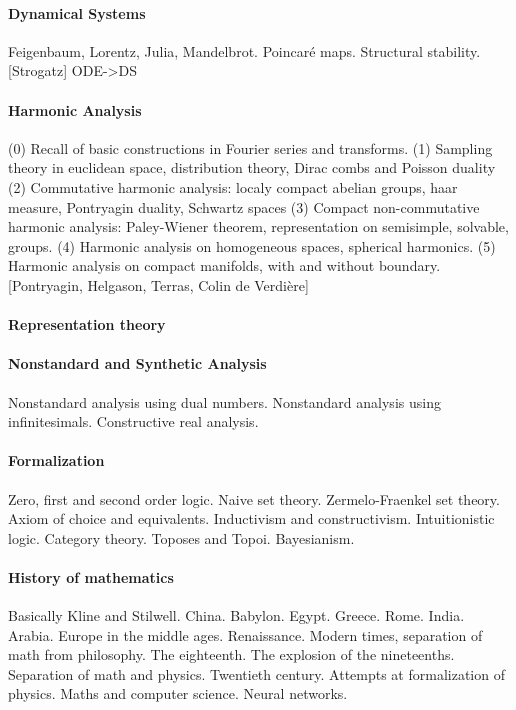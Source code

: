 \paragraph{Dynamical Systems}
Feigenbaum, Lorentz, Julia, Mandelbrot.
Poincaré maps.  Structural stability.
[Strogatz]
{ODE->DS}

\paragraph{Harmonic Analysis}
(0) Recall of basic constructions in Fourier series and transforms.
(1) Sampling theory in euclidean space, distribution theory, Dirac combs and
Poisson duality
(2) Commutative harmonic analysis: localy compact abelian groups, haar
measure, Pontryagin duality, Schwartz spaces
(3) Compact non-commutative harmonic analysis: Paley-Wiener theorem,
representation on semisimple, solvable, groups.
(4) Harmonic analysis on homogeneous spaces, spherical harmonics.
(5) Harmonic analysis on compact manifolds, with and without boundary.
[Pontryagin, Helgason, Terras, Colin de Verdière]


\paragraph{Representation theory}

\paragraph{Nonstandard and Synthetic Analysis}
Nonstandard analysis using dual numbers.
Nonstandard analysis using infinitesimals.
Constructive real analysis.

\paragraph{Formalization}
Zero, first and second order logic.
Naive set theory.
Zermelo-Fraenkel set theory.
Axiom of choice and equivalents.
Inductivism and constructivism.
Intuitionistic logic.
Category theory.
Toposes and Topoi.
Bayesianism.

\paragraph{History of mathematics}
Basically Kline and Stilwell.
China.  Babylon.  Egypt.  Greece.  Rome.  India.  Arabia.
Europe in the middle ages.
Renaissance.  Modern times, separation of math from philosophy.
The eighteenth.  The explosion of the nineteenths.
Separation of math and physics.
Twentieth century.  Attempts at formalization of physics.
Maths and computer science.  Neural networks.

